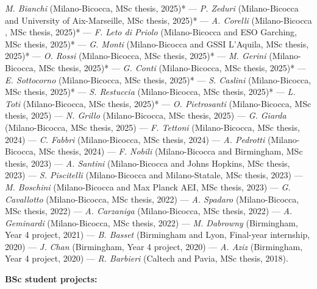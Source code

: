 \textit{M. Bianchi} (Milano-Bicocca, MSc thesis, 2025)* --- 
\textit{P. Zeduri} (Milano-Bicocca and University of Aix-Marseille, MSc thesis, 2025)* --- 
\textit{A. Corelli} (Milano-Bicocca , MSc thesis, 2025)* --- 
\textit{F. Leto di Priolo} (Milano-Bicocca and ESO Garching, MSc thesis, 2025)* --- 
\textit{G. Monti} (Milano-Bicocca and GSSI L'Aquila, MSc thesis, 2025)* --- 
\textit{O. Rossi} (Milano-Bicocca, MSc thesis, 2025)* --- 
\textit{M. Gerini} (Milano-Bicocca, MSc thesis, 2025)* --- 
\textit{G. Conti} (Milano-Bicocca, MSc thesis, 2025)* --- 
\textit{E. Sottocorno} (Milano-Bicocca, MSc thesis, 2025)* --- 
\textit{S. Caslini} (Milano-Bicocca, MSc thesis, 2025)* --- 
\textit{S. Restuccia} (Milano-Bicocca, MSc thesis, 2025)* --- 
\textit{L. Toti} (Milano-Bicocca, MSc thesis, 2025)* --- 
\textit{O. Pietrosanti} (Milano-Bicocca, MSc thesis, 2025) --- 
\textit{N. Grillo} (Milano-Bicocca, MSc thesis, 2025) --- 
\textit{G. Giarda} (Milano-Bicocca, MSc thesis, 2025) --- 
\textit{F. Tettoni} (Milano-Bicocca, MSc thesis, 2024) --- 
\textit{C. Fabbri} (Milano-Bicocca, MSc thesis, 2024) --- 
\textit{A. Pedrotti} (Milano-Bicocca, MSc thesis, 2024) --- 
\textit{F. Nobili} (Milano-Bicocca and Birmingham, MSc thesis, 2023) --- 
\textit{A. Santini} (Milano-Bicocca and Johns Hopkins, MSc thesis, 2023) --- 
\textit{S. Piscitelli} (Milano-Bicocca and Milano-Statale, MSc thesis, 2023) --- 
\textit{M. Boschini} (Milano-Bicocca and Max Planck AEI, MSc thesis, 2023) --- 
\textit{G. Cavallotto} (Milano-Bicocca, MSc thesis, 2022) --- 
\textit{A. Spadaro} (Milano-Bicocca, MSc thesis, 2022) --- 
\textit{A. Carzaniga} (Milano-Bicocca, MSc thesis, 2022) --- 
\textit{A. Geminardi} (Milano-Bicocca, MSc thesis, 2022) --- 
\textit{M. Dabrowny} (Birmingham, Year 4 project, 2021) --- 
\textit{B. Basset} (Birmingham and Lyon, Final-year internship, 2020) --- 
\textit{J. Chan} (Birmingham, Year 4 project, 2020) --- 
\textit{A. Aziz} (Birmingham, Year 4 project, 2020) --- 
\textit{R. Barbieri} (Caltech and Pavia, MSc thesis, 2018).

\vspace{0.2cm}
\textbf{BSc student projects:}

